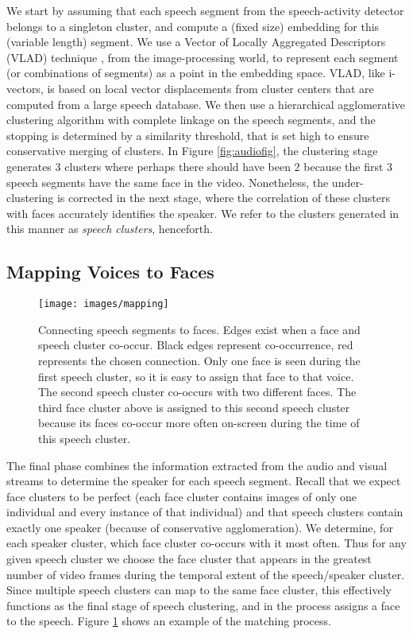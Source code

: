 \documentclass[a4paper]{article}
\begin{document}
We start by assuming that each speech segment from the speech-activity detector belongs to a singleton cluster, and compute a (fixed size) embedding for this (variable length) segment.  We use a Vector of Locally Aggregated Descriptors (VLAD) technique \cite{Jeg10}, from the image-processing world, to represent each segment (or combinations of segments) as a point in the embedding space. VLAD, like i-vectors, is based on local vector displacements from cluster centers that are computed from a large speech database. We then use a hierarchical agglomerative clustering \cite{Rok05} algorithm with complete linkage \cite{Def77} on the speech segments, and the stopping is determined by a similarity threshold, that is set high to ensure conservative merging of clusters. In Figure \ref{fig:audiofig}, the clustering stage generates 3 clusters where perhaps there should have been 2 because the first 3 speech segments have the same face in the video. Nonetheless, the under-clustering is corrected in the next stage, where the correlation of these clusters with faces accurately identifies the speaker. 
We refer to the clusters generated in this manner as {\it speech clusters}, henceforth.

\subsection{Mapping Voices to Faces}
\label{subsec:mappingfacevoice}

\begin{figure}[t]
  \texttt{[image: images/mapping]}
  \caption{Connecting speech segments to faces. Edges exist when a face and speech cluster co-occur. Black edges represent co-occurrence, red represents the chosen connection. Only one face is seen during the first speech cluster, so it is easy to assign that face to that voice. The second speech cluster co-occurs with two different faces. The third face cluster above is assigned to this second speech cluster because its faces co-occur more often on-screen during the time of this speech cluster.}
  \label{fig:mapping}
\end{figure}

The final phase combines the information extracted from the audio and visual streams to determine the speaker for each speech segment. Recall that we expect face clusters to be perfect (each face cluster contains images of only one individual and every instance of that individual) and that speech clusters contain exactly one speaker (because of conservative agglomeration). We determine, for each speaker cluster, which face cluster co-occurs with it most often. Thus for any given speech cluster we choose the face cluster that appears in the greatest number of video frames during the temporal extent of the speech/speaker cluster. Since multiple speech clusters can map to the same face cluster, this effectively functions as the final stage of speech clustering, and in the process assigns a face to the speech. Figure \ref{fig:mapping} shows an example of the matching process. 
\end{document}
